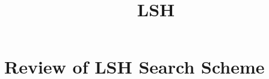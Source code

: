 \documentclass{beamer}
\title{LSH}
\begin{document}
	\maketitle
	\section{Review of LSH Search Scheme}
	
	
\end{document}

